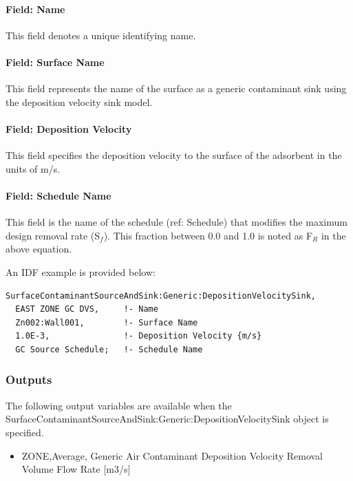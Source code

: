 \paragraph{Field: Name}\label{field-name-16-004}

This field denotes a unique identifying name.

\paragraph{Field: Surface Name}\label{field-surface-name-4-000}

This field represents the name of the surface as a generic contaminant sink using the deposition velocity sink model.

\paragraph{Field: Deposition Velocity}\label{field-deposition-velocity}

This field specifies the deposition velocity to the surface of the adsorbent in the units of m/s.

\paragraph{Field: Schedule Name}\label{field-schedule-name-9}

This field is the name of the schedule (ref: Schedule) that modifies the maximum design removal rate (S\(_{f}\)). This fraction between 0.0 and 1.0 is noted as F\(_{R}\) in the above equation.

An IDF example is provided below:

\begin{lstlisting}
SurfaceContaminantSourceAndSink:Generic:DepositionVelocitySink,
  EAST ZONE GC DVS,     !- Name
  Zn002:Wall001,        !- Surface Name
  1.0E-3,               !- Deposition Velocity {m/s}
  GC Source Schedule;   !- Schedule Name
\end{lstlisting}

\subsubsection{Outputs}\label{outputs-12-003}

The following output variables are available when the Surface\-Contaminant\-Source\-And\-Sink:\-Generic:\-Deposition\-Velocity\-Sink object is specified.

\begin{itemize}
    \tightlist
  \item
    ZONE,Average, Generic Air Contaminant Deposition Velocity Removal Volume Flow Rate {[}m3/s{]}
\end{itemize}

